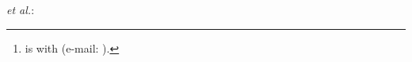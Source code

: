 \documentclass[journal]{IEEEtran}
\begin{document}
\title{\PaperTitle}

\author{%
  \IEEEauthorblockN{\AuthorOneName}%
  \thanks{\AuthorOneName{} is with \AuthorOneAffil{} (e-mail: \AuthorOneEmail).}%
}

\markboth{\PaperShortTitle}%
         {\AuthorOneName \MakeLowercase{\textit{et al.}}: \PaperShortTitle}

\maketitle

\begin{abstract}
  
\end{abstract}

\begin{IEEEkeywords}
  \PaperKeywords
\end{IEEEkeywords}

\IEEEpeerreviewmaketitle





\end{document}
